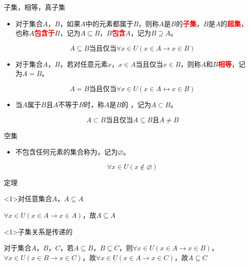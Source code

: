 \documentclass[xetex,10pt,aspectratio=43]{beamer}
\begin{document}
	\begin{frame}{子集，相等，真子集}
		
		\begin{itemize}
		
			\item<1>对于集合$A$，$B$，如果$A$中的元素都属于$B$，则称$A$是$B$的\textcolor{red}{\textbf{子集}}，$B$是$A$的\textcolor{red}{\textbf{超集}}，也称$A$\textcolor{red}{\textbf{包含于}}$B$，记为$A\subseteq B$，$B$\textcolor{red}{\textbf{包含}}$A$，记为$B\supseteq A$。
			
			$$A\subseteq B\text{当且仅当}\forall x\in U(x\in A\rightarrow x\in B)$$
			
				
			\item<1>对于集合$A$，$B$，若对任意元素$x$，$x\in A$当且仅当$x\in B$，则称$A$和$B$\textcolor{red}{\textbf{相等}}，记为$A=B$。
			
			$$A=B\text{当且仅当}\forall x\in U(x\in A\leftrightarrow x\in B)$$
			
			\item<1>当$A$属于$B$且$A$不等于$B$时，称$A$是$B$的\textcolor{red}{
				}，记为$A\subset B$。
			
			$$A\subset B\text{当且仅当}A\subseteq B\text{且}A\not=B$$
		
		\end{itemize}
		
	\end{frame}

	\begin{frame}{空集}
	
		\begin{itemize}
			
			\item<1>不包含任何元素的集合称为\textcolor{red}{}，记为$\varnothing$。
			
			$$\forall x\in U(x\notin\varnothing)$$
			
		\end{itemize}
	
	\end{frame}

	\begin{frame}{定理}
		
	
		\begin{block}<1>{对任意集合$A$，$A\subseteq A$}
			
			$\forall x\in U(x\in A\rightarrow x\in A)$，故$A\subseteq A$
			
		\end{block}
	
		\begin{block}<1>{子集关系是传递的}
			
			对于集合$A$，$B$，$C$，若$A\subseteq B$，$B\subseteq C$，则$\forall x\in U(x\in A\rightarrow x\in B)$，$\forall x\in U(x\in B\rightarrow x\in C)$，故$\forall x\in U(x\in A\rightarrow x\in C)$，故$A\subseteq C$
			
		\end{block}
	
	\end{frame}
\end{document}

